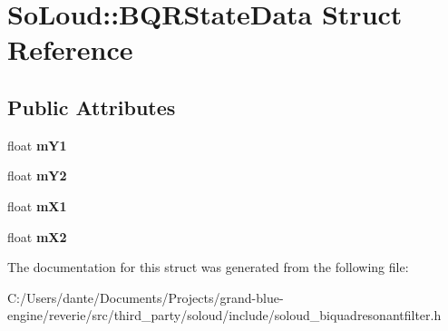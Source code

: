 \hypertarget{struct_so_loud_1_1_b_q_r_state_data}{}\section{So\+Loud\+::B\+Q\+R\+State\+Data Struct Reference}
\label{struct_so_loud_1_1_b_q_r_state_data}
\subsection*{Public Attributes}
\begin{DoxyCompactItemize}
\item 
\mbox{\label{struct_so_loud_1_1_b_q_r_state_data_a80b0ecee8f145458a18168971bcbf88d}} 
float {\bfseries m\+Y1}
\item 
\mbox{\label{struct_so_loud_1_1_b_q_r_state_data_a143a6664fd0bb1a4d1be9b53796bf93c}} 
float {\bfseries m\+Y2}
\item 
\mbox{\label{struct_so_loud_1_1_b_q_r_state_data_ae5f9b17ba8305d7ef6e07fc682aea939}} 
float {\bfseries m\+X1}
\item 
\mbox{\label{struct_so_loud_1_1_b_q_r_state_data_ae614479ecebade22c1a941e1a2fbe6b0}} 
float {\bfseries m\+X2}
\end{DoxyCompactItemize}


The documentation for this struct was generated from the following file\+:\begin{DoxyCompactItemize}
\item 
C\+:/\+Users/dante/\+Documents/\+Projects/grand-\/blue-\/engine/reverie/src/third\+\_\+party/soloud/include/soloud\+\_\+biquadresonantfilter.\+h\end{DoxyCompactItemize}
